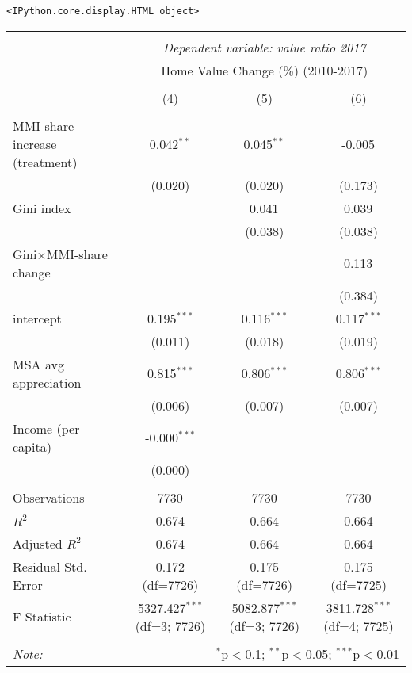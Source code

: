 \documentclass[11pt]{article}
\makeatletter
\newcommand{\boxspacing}{\kern\kvtcb@left@rule\kern\kvtcb@boxsep}
\newcommand{\prompt}[4]{
        {\ttfamily\llap{{\color{#2}[#3]:\hspace{3pt}#4}}\vspace{-\baselineskip}}
    }
\makeatother
\begin{document}
            \begin{tcolorbox}[breakable, size=fbox, boxrule=.5pt, pad at break*=1mm, opacityfill=0]
\prompt{Out}{outcolor}{38}{\boxspacing}
\begin{Verbatim}[commandchars=\\\{\}]
<IPython.core.display.HTML object>
\end{Verbatim}
\end{tcolorbox}
\begin{table}[H] \centering
    \begin{tabular}{@{\extracolsep{5pt}}lccc}
    \\[-1.8ex]\hline
    \hline \\[-1.8ex]
    & \multicolumn{3}{c}{\textit{Dependent variable: value ratio 2017}} \
    \cr \cline{2-4}
    \\[-1.8ex] & \multicolumn{3}{c}{Home Value Change (\%) (2010-2017)}  \\
    \\[-1.8ex] & (4) & (5) & (6) \\
    \hline \\[-1.8ex]
    MMI-share increase (treatment) & 0.042$^{**}$ & 0.045$^{**}$ & -0.005$^{}$ \\
    & (0.020) & (0.020) & (0.173) \\
     Gini index & & 0.041$^{}$ & 0.039$^{}$ \\
    & & (0.038) & (0.038) \\
     Gini$\times$MMI-share change & & & 0.113$^{}$ \\
    & & & (0.384) \\
     intercept & 0.195$^{***}$ & 0.116$^{***}$ & 0.117$^{***}$ \\
    & (0.011) & (0.018) & (0.019) \\
     MSA avg appreciation & 0.815$^{***}$ & 0.806$^{***}$ & 0.806$^{***}$ \\
    & (0.006) & (0.007) & (0.007) \\
     Income (per capita) & -0.000$^{***}$ & & \\
    & (0.000) & & \\
    \hline \\[-1.8ex]
     Observations & 7730 & 7730 & 7730 \\
     $R^2$ & 0.674 & 0.664 & 0.664 \\
     Adjusted $R^2$ & 0.674 & 0.664 & 0.664 \\
     Residual Std. Error & 0.172 (df=7726) & 0.175 (df=7726) & 0.175 (df=7725) \\
     F Statistic & 5327.427$^{***}$ (df=3; 7726) & 5082.877$^{***}$ (df=3; 7726) & 3811.728$^{***}$ (df=4; 7725) \\
    \hline
    \hline \\[-1.8ex]
    \textit{Note:} & \multicolumn{3}{r}{$^{*}$p$<$0.1; $^{**}$p$<$0.05; $^{***}$p$<$0.01} \\
    \end{tabular}
    \end{table}
\end{document}
